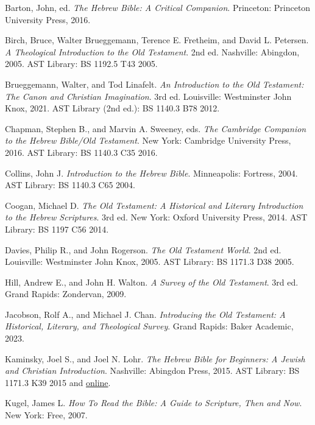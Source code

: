 \documentclass[titlepage]{article}
\begin{document}
\begin{thebibliography}{99}%

	 Barton, John, ed.
	\emph{The Hebrew Bible: A Critical Companion}.
	Princeton: Princeton University Press, 2016.

	 Birch, Bruce, Walter Brueggemann, Terence E. Fretheim, and David L. Petersen.
	\emph{A Theological Introduction to the Old Testament}.
	2nd ed. Nashville: Abingdon, 2005.
	AST Library: BS 1192.5 T43 2005.

	 Brueggemann, Walter, and Tod Linafelt.
	\emph{An Introduction to the Old Testament: The Canon and Christian Imagination}.
	3rd ed. Louisville: Westminster John Knox, 2021.
	AST Library (2nd ed.): BS 1140.3 B78 2012.

	 Chapman, Stephen B., and Marvin A. Sweeney, eds.
	\emph{The Cambridge Companion to the Hebrew Bible/Old Testament}.
	New York: Cambridge University Press, 2016.
	AST Library: BS 1140.3 C35 2016.

	 Collins, John J.
	\emph{Introduction to the Hebrew Bible}.
	Minneapolis: Fortress, 2004.
	AST Library: BS 1140.3 C65 2004.

	 Coogan, Michael D.
	\emph{The Old Testament: A Historical and Literary Introduction to the Hebrew Scriptures}.
	3rd ed. New York: Oxford University Press, 2014.
	AST Library: BS 1197 C56 2014.

	 Davies, Philip R., and John Rogerson.
	\emph{The Old Testament World}.
	2nd ed. Louisville: Westminster John Knox, 2005.
	AST Library: BS 1171.3 D38 2005.

	 Hill, Andrew E., and John H. Walton.
	\emph{A Survey of the Old Testament}.
	3rd ed. Grand Rapids: Zondervan, 2009.

	 Jacobson, Rolf A., and Michael J. Chan.
	\emph{Introducing the Old Testament: A Historical, Literary, and Theological Survey}.
	Grand Rapids: Baker Academic, 2023.

	 Kaminsky, Joel S., and Joel N. Lohr.
	\emph{The Hebrew Bible for Beginners: A Jewish and Christian Introduction}.
	Nashville: Abingdon Press, 2015.
	AST Library: BS 1171.3 K39 2015 and \href{https://search.ebscohost.com/login.aspx?direct=true&AuthType=cookie,ip,shib&db=nlebk&AN=969753&site=ehost-live&scope=site&custid=s5315951}{online}.

	 Kugel, James L.
	\emph{How To Read the Bible: A Guide to Scripture, Then and Now}.
	New York: Free, 2007.


\end{thebibliography}
\end{document}
